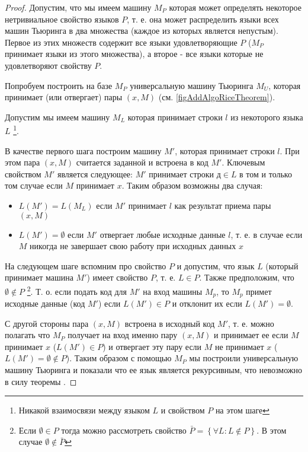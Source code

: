 \begin{proof}
Допустим, что мы имеем машину $M_P$ которая может определять
некоторое нетривиальное свойство языков $P$, т. е. она может
распределить языки всех 
машин Тьюринга в два множества (каждое из которых является непустым). 
Первое из этих множеств содержит все языки удовлетворяющие $P$ ($M_P$
принимает языки из этого множества), а второе - все языки которые не
удовлетворяют свойству $P$. 



Попробуем построить на базе $M_P$ универсальную машину Тьюринга $M_U$,
которая принимает (или отвергает) пары $\left(x, M\right)$ 
(см. \autoref{figAddAlgoRiceTheorem}).

Допустим мы имеем машину $M_L$ которая принимает строки $l$ из
некоторого языка $L$
\footnote{Никакой взаимосвязи между языком $L$ и свойством $P$ на этом шаге}.

В качестве первого шага построим машину $M'$, которая принимает строки
$l$. При этом пара $\left(x, M\right)$ считается заданной и встроена в
код $M'$. Ключевым свойством $M'$ является следующее: $M'$ принимает
строки $д \in L$ в том и только том случае если $M$ 
принимает $x$. Таким образом возможны два случая:
\begin{itemize}
\item $L(M') = L(M_L)$ если $M'$ принимает $l$ как результат приема
  пары $\left(x, M\right)$ 
\item $L(M') = \emptyset$ если $M'$ отвергает любые исходные данные
  $l$,
т. е. в случае если $M$ никогда не завершает свою работу при исходных
данных $x$ 
\end{itemize}

На следующем шаге вспомним про свойство $P$ и допустим, что язык $L$
(который принимает машина $M'$) имеет свойство $P$, т. е. $L \in
P$. Также предположим, что $\emptyset \notin P$
\footnote{
Если $\emptyset \in P$ тогда можно рассмотреть свойство 
$\bar{P} = \left\{\forall L: L \notin P\right\}$. В этом случае
$\emptyset \notin \bar{P}$
}. 
Т. о. если подать код
для $M'$ на вход машины $M_p$, то $M_p$ примет исходные данные (код
$M'$) если $L(M') \in P$ и отклонит их если $L(M') = \emptyset$.

С другой стороны пара $\left(x, M\right)$ встроена в исходный код
$M'$, т. е. можно полагать что $M_P$ получает на вход именно пару 
$\left(x, M\right)$ и принимает ее если $M$ принимает $x$
($L\left(M'\right) \in P$) и отвергает
эту пару если $M$ не принимает $x$ 
($L\left(M'\right) = \emptyset \notin P$). Таким образом с помощью
$M_P$ мы построили универсальную машину Тьюринга и показали что ее
язык является рекурсивным, что невозможно в силу теоремы 
.
\end{proof}

